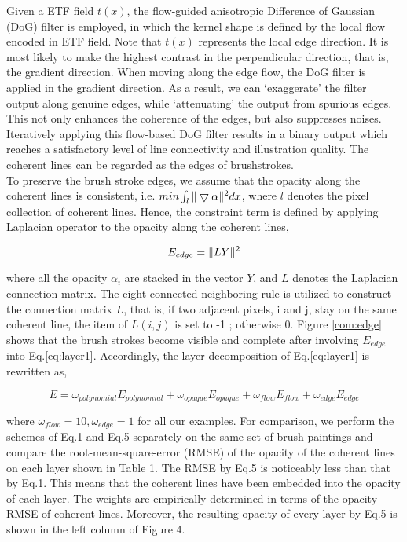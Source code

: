Given a ETF field $t(x)$, the flow-guided anisotropic Difference of Gaussian (DoG) filter is employed, in which the kernel shape is defined by the local flow encoded in ETF field. Note that $t(x)$ represents the local edge direction. It is most likely to make the highest contrast in the perpendicular direction, that is, the gradient direction. When moving along the edge flow, the DoG filter is applied in the gradient direction. As a result, we can ‘exaggerate’ the filter output along genuine edges, while ‘attenuating’ the output from spurious edges. This not only enhances the coherence of the edges, but also suppresses noises. Iteratively applying this flow-based DoG filter results in a binary output which reaches a satisfactory level of line connectivity and illustration quality. The coherent lines can be regarded as the edges of brushstrokes. \\
To preserve the brush stroke edges, we assume that the opacity along the coherent lines is consistent, i.e. $min \int_{l}\Arrowvert \bigtriangledown\alpha \Arrowvert^2 dx $, where $l$ denotes the pixel collection of coherent lines. Hence, the constraint term is defined by applying Laplacian operator to the opacity along the coherent lines,

\begin{equation} 
E_{edge}=\Arrowvert LY \Arrowvert^2 
\end{equation} 

where all the opacity $\alpha_i$ are stacked in the vector $Y$, and $L$ denotes the Laplacian connection matrix. The eight-connected neighboring rule is utilized to construct the connection matrix $L$, that is, if two adjacent pixels, i and j, stay on the same coherent line, the item of $L(i,j)$ is set to -1 ; otherwise 0. Figure \ref{com:edge} shows that the brush strokes become visible and complete after involving $E_{edge}$ into Eq.\ref{eq:layer1}.
Accordingly, the layer decomposition of Eq.\ref{eq:layer1} is rewritten as,

\begin{equation}
E=\omega_{polynomial}E_{polynomial}+
\omega_{opaque}E_{opaque}+\omega_{flow}E_{flow}+\omega_{edge}E_{edge}
\label{eq:layer_sum}
\end{equation} 

where $\omega_{flow} = 10 ,\omega_{edge}=1$ for all our examples. For comparison, we perform the schemes of Eq.1 and Eq.5 separately on the same set of brush paintings and compare the root-mean-square-error (RMSE) of the opacity of the coherent lines on each layer shown in Table 1. The RMSE by Eq.5 is noticeably less than that by Eq.1. This means that the coherent lines have been embedded into the opacity of each layer. The weights are empirically determined in terms of the opacity RMSE of coherent lines. Moreover, the resulting opacity of every layer by Eq.5 is shown in the left column of Figure 4.
